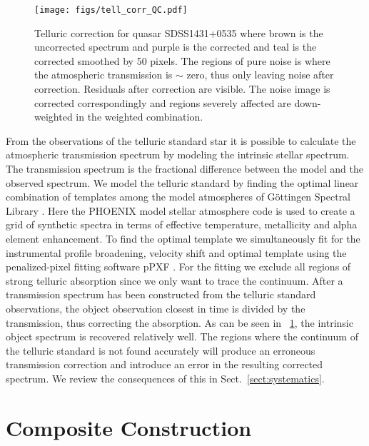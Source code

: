 \documentclass{aa}    %
\newcommand{\figref}[1]{\ref{fig:#1}}
\newcommand{\Fig}[1]{\figurename~\figref{#1}}
\newcommand{\fig}[1]{\Fig{#1}}
\newcommand{\figlabel}[1]{\label{fig:#1}}
\newcommand{\sectionname}{Sect.}
\newcommand{\Sect}[1]{\sectionname~\ref{sect:#1}}
\newcommand{\sect}[1]{\Sect{#1}}
\newcommand{\sectlabel}[1]{\label{sect:#1}}
\begin{document}
\begin{figure}[t!]
  \centering
  \texttt{[image: figs/tell\_corr\_QC.pdf]}
  \caption[]{Telluric correction for quasar SDSS1431+0535 where brown is the uncorrected spectrum and purple is the corrected and teal is the corrected smoothed by 50 pixels. The regions of pure noise is where the atmospheric transmission is $\sim$ zero, thus only leaving noise after correction. Residuals after correction are visible. The noise image is corrected correspondingly and regions severely affected are down-weighted in the weighted combination.}
\figlabel{telluric_qc}
\end{figure}


From the observations of the telluric standard star it is possible to calculate the atmospheric transmission spectrum by modeling the intrinsic stellar spectrum. The transmission spectrum is the fractional difference between the model and the observed spectrum. We model the telluric standard by finding the optimal linear combination of templates among the model atmospheres of G\"ottingen Spectral Library \citep{Husser2013}. Here the PHOENIX model stellar atmosphere code is used to create a grid of synthetic spectra in terms of effective temperature, metallicity and alpha element enhancement. To find the optimal template we simultaneously fit for the instrumental profile broadening, velocity shift and optimal template using the penalized-pixel fitting software pPXF \citep{Cappellari2004}. For the fitting we exclude all regions of strong telluric absorption since we only want to trace the continuum. After a transmission spectrum has been constructed from the telluric standard observations, the object observation closest in time is divided by the transmission, thus correcting the absorption. As can be seen in \fig{telluric_qc}, the intrinsic object spectrum is recovered relatively well. The regions where the continuum of the telluric standard is not found accurately will produce an erroneous transmission correction and introduce an error in the resulting corrected spectrum. We review the consequences of this in \sect{systematics}. 



\section{Composite Construction}   \sectlabel{construct}
\end{document}
